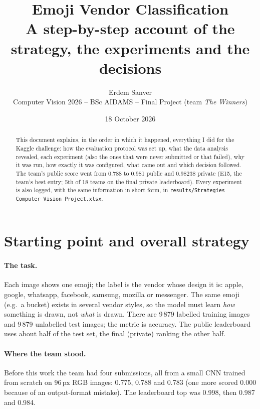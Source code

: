 \documentclass[11pt,a4paper]{article}
\title{\textbf{Emoji Vendor Classification}\\[3pt]
\large A step-by-step account of the strategy, the experiments and the decisions}
\author{Erdem Sanver\\\small Computer Vision 2026 -- BSc AIDAMS -- Final Project (team \emph{The Winners})}
\date{18 October 2026}
\newcommand{\code}[1]{\texttt{#1}}
\begin{document}
\maketitle

\begin{abstract}
\noindent This document explains, in the order in which it happened, everything I did for the Kaggle
challenge: how the evaluation protocol was set up, what the data analysis revealed, each experiment
(also the ones that were never submitted or that failed), why it was run, how exactly it was
configured, what came out and which decision followed. The team's public score went from 0.788 to
0.981 public and 0.98238 private (E15, the team's best entry; 5th of 18 teams on the final private leaderboard). Every experiment is also logged, with the same
information in short form, in \code{results/Strategies Computer Vision Project.xlsx}.
\end{abstract}

\tableofcontents
\bigskip

\section{Starting point and overall strategy}

\paragraph{The task.} Each image shows one emoji; the label is the vendor whose design it is:
apple, google, whatsapp, facebook, samsung, mozilla or messenger. The same emoji (e.g.\ a bucket)
exists in several vendor styles, so the model must learn \emph{how} something is drawn, not
\emph{what} is drawn. There are 9\,879 labelled training images and 9\,879 unlabelled test images;
the metric is accuracy. The public leaderboard uses about half of the test set, the final
(private) ranking the other half.

\paragraph{Where the team stood.} Before this work the team had four submissions, all from a
small CNN trained from scratch on 96\,px RGB images: 0.775, 0.788 and 0.783 (one more scored 0.000
because of an output-format mistake). The leaderboard top was 0.998, then 0.987 and 0.984.
\end{document}
